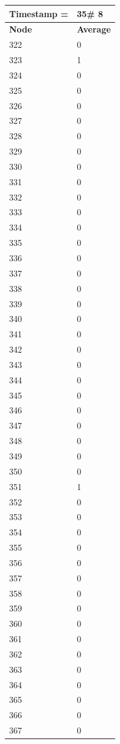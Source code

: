 \begin{tabular}{|l||l|}
\hline
\textbf{Timestamp =} & \textbf{35}\# 8\\\hline
	\textbf{Node} & \textbf{Average} \\ \hline
\hline
	322 & 0 \\ \hline
	323 & 1 \\ \hline
	324 & 0 \\ \hline
	325 & 0 \\ \hline
	326 & 0 \\ \hline
	327 & 0 \\ \hline
	328 & 0 \\ \hline
	329 & 0 \\ \hline
	330 & 0 \\ \hline
	331 & 0 \\ \hline
	332 & 0 \\ \hline
	333 & 0 \\ \hline
	334 & 0 \\ \hline
	335 & 0 \\ \hline
	336 & 0 \\ \hline
	337 & 0 \\ \hline
	338 & 0 \\ \hline
	339 & 0 \\ \hline
	340 & 0 \\ \hline
	341 & 0 \\ \hline
	342 & 0 \\ \hline
	343 & 0 \\ \hline
	344 & 0 \\ \hline
	345 & 0 \\ \hline
	346 & 0 \\ \hline
	347 & 0 \\ \hline
	348 & 0 \\ \hline
	349 & 0 \\ \hline
	350 & 0 \\ \hline
	351 & 1 \\ \hline
	352 & 0 \\ \hline
	353 & 0 \\ \hline
	354 & 0 \\ \hline
	355 & 0 \\ \hline
	356 & 0 \\ \hline
	357 & 0 \\ \hline
	358 & 0 \\ \hline
	359 & 0 \\ \hline
	360 & 0 \\ \hline
	361 & 0 \\ \hline
	362 & 0 \\ \hline
	363 & 0 \\ \hline
	364 & 0 \\ \hline
	365 & 0 \\ \hline
	366 & 0 \\ \hline
	367 & 0 \\ \hline
\end{tabular}
